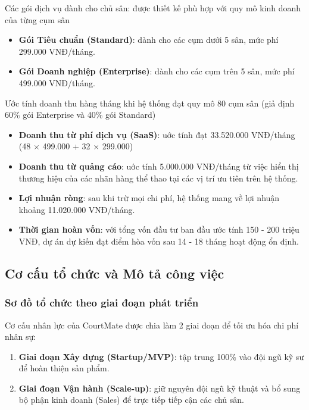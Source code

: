 \noindent Các gói dịch vụ dành cho chủ sân: được thiết kế phù hợp với quy mô kinh doanh của từng cụm sân
\begin{itemize}
    \item \textbf{Gói Tiêu chuẩn (Standard)}: dành cho các cụm dưới 5 sân, mức phí 299.000 VNĐ/tháng.
    \item \textbf{Gói Doanh nghiệp (Enterprise)}: dành cho các cụm trên 5 sân, mức phí 499.000 VNĐ/tháng.
\end{itemize} 
\vspace{0.5cm}
\noindent Ước tính doanh thu hàng tháng khi hệ thống đạt quy mô 80 cụm sân (giả định 60\% gói Enterprise và 40\% gói Standard)
\begin{itemize}
    \item \textbf{Doanh thu từ phí dịch vụ (SaaS)}: uớc tính đạt 33.520.000 VNĐ/tháng (48 $\times$ 499.000 + 32 $\times$ 299.000)
    \item \textbf{Doanh thu từ quảng cáo}: uớc tính 5.000.000 VNĐ/tháng từ việc hiển thị thương hiệu của các nhãn hàng thể thao tại các vị trí ưu tiên trên hệ thống.
    \item \textbf{Lợi nhuận ròng}: sau khi trừ mọi chi phí, hệ thống mang về lợi nhuận khoảng 11.020.000 VNĐ/tháng.
    \item \textbf{Thời gian hoàn vốn}: với tổng vốn đầu tư ban đầu ước tính 150 - 200 triệu VNĐ, dự án dự kiến đạt điểm hòa vốn sau 14 - 18 tháng hoạt động ổn định.
\end{itemize}


\subsection{Cơ cấu tổ chức và Mô tả công việc}
\subsubsection{Sơ đồ tổ chức theo giai đoạn phát triển}
Cơ cấu nhân lực của CourtMate được chia làm 2 giai đoạn để tối ưu hóa chi phí nhân sự:
\begin{enumerate}
    \item \textbf{Giai đoạn Xây dựng (Startup/MVP)}: tập trung 100\% vào đội ngũ kỹ sư để hoàn thiện sản phẩm.
    \item \textbf{Giai đoạn Vận hành (Scale-up)}: giữ nguyên đội ngũ kỹ thuật và bổ sung bộ phận kinh doanh (Sales) để trực tiếp tiếp cận các chủ sân.
\end{enumerate}

